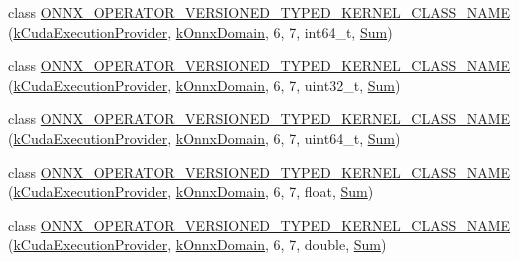 \begin{DoxyCompactItemize}
\item 
class \mbox{\hyperlink{namespaceonnxruntime_1_1cuda_a2d3f8c533847ea31957b95a5ee298db0}{O\+N\+N\+X\+\_\+\+O\+P\+E\+R\+A\+T\+O\+R\+\_\+\+V\+E\+R\+S\+I\+O\+N\+E\+D\+\_\+\+T\+Y\+P\+E\+D\+\_\+\+K\+E\+R\+N\+E\+L\+\_\+\+C\+L\+A\+S\+S\+\_\+\+N\+A\+ME}} (\mbox{\hyperlink{namespaceonnxruntime_a73ebc64887ddd1968e3cef47ffefe35b}{k\+Cuda\+Execution\+Provider}}, \mbox{\hyperlink{namespaceonnxruntime_ac0e7c0c106a2c9e9594560a3ab289fa0}{k\+Onnx\+Domain}}, 6, 7, int64\+\_\+t, \mbox{\hyperlink{classonnxruntime_1_1cuda_1_1Sum}{Sum}})
\item 
class \mbox{\hyperlink{namespaceonnxruntime_1_1cuda_a35c31ee0fd61915f512dd56a065baf58}{O\+N\+N\+X\+\_\+\+O\+P\+E\+R\+A\+T\+O\+R\+\_\+\+V\+E\+R\+S\+I\+O\+N\+E\+D\+\_\+\+T\+Y\+P\+E\+D\+\_\+\+K\+E\+R\+N\+E\+L\+\_\+\+C\+L\+A\+S\+S\+\_\+\+N\+A\+ME}} (\mbox{\hyperlink{namespaceonnxruntime_a73ebc64887ddd1968e3cef47ffefe35b}{k\+Cuda\+Execution\+Provider}}, \mbox{\hyperlink{namespaceonnxruntime_ac0e7c0c106a2c9e9594560a3ab289fa0}{k\+Onnx\+Domain}}, 6, 7, uint32\+\_\+t, \mbox{\hyperlink{classonnxruntime_1_1cuda_1_1Sum}{Sum}})
\item 
class \mbox{\hyperlink{namespaceonnxruntime_1_1cuda_a71ba95d89c04058066ff5298bfc0c619}{O\+N\+N\+X\+\_\+\+O\+P\+E\+R\+A\+T\+O\+R\+\_\+\+V\+E\+R\+S\+I\+O\+N\+E\+D\+\_\+\+T\+Y\+P\+E\+D\+\_\+\+K\+E\+R\+N\+E\+L\+\_\+\+C\+L\+A\+S\+S\+\_\+\+N\+A\+ME}} (\mbox{\hyperlink{namespaceonnxruntime_a73ebc64887ddd1968e3cef47ffefe35b}{k\+Cuda\+Execution\+Provider}}, \mbox{\hyperlink{namespaceonnxruntime_ac0e7c0c106a2c9e9594560a3ab289fa0}{k\+Onnx\+Domain}}, 6, 7, uint64\+\_\+t, \mbox{\hyperlink{classonnxruntime_1_1cuda_1_1Sum}{Sum}})
\item 
class \mbox{\hyperlink{namespaceonnxruntime_1_1cuda_a39e04d1510f67cd03996d46013557bdc}{O\+N\+N\+X\+\_\+\+O\+P\+E\+R\+A\+T\+O\+R\+\_\+\+V\+E\+R\+S\+I\+O\+N\+E\+D\+\_\+\+T\+Y\+P\+E\+D\+\_\+\+K\+E\+R\+N\+E\+L\+\_\+\+C\+L\+A\+S\+S\+\_\+\+N\+A\+ME}} (\mbox{\hyperlink{namespaceonnxruntime_a73ebc64887ddd1968e3cef47ffefe35b}{k\+Cuda\+Execution\+Provider}}, \mbox{\hyperlink{namespaceonnxruntime_ac0e7c0c106a2c9e9594560a3ab289fa0}{k\+Onnx\+Domain}}, 6, 7, float, \mbox{\hyperlink{classonnxruntime_1_1cuda_1_1Sum}{Sum}})
\item 
class \mbox{\hyperlink{namespaceonnxruntime_1_1cuda_a88478e594ecf0aef6b6fd01f4c493806}{O\+N\+N\+X\+\_\+\+O\+P\+E\+R\+A\+T\+O\+R\+\_\+\+V\+E\+R\+S\+I\+O\+N\+E\+D\+\_\+\+T\+Y\+P\+E\+D\+\_\+\+K\+E\+R\+N\+E\+L\+\_\+\+C\+L\+A\+S\+S\+\_\+\+N\+A\+ME}} (\mbox{\hyperlink{namespaceonnxruntime_a73ebc64887ddd1968e3cef47ffefe35b}{k\+Cuda\+Execution\+Provider}}, \mbox{\hyperlink{namespaceonnxruntime_ac0e7c0c106a2c9e9594560a3ab289fa0}{k\+Onnx\+Domain}}, 6, 7, double, \mbox{\hyperlink{classonnxruntime_1_1cuda_1_1Sum}{Sum}})

\end{DoxyCompactItemize}
